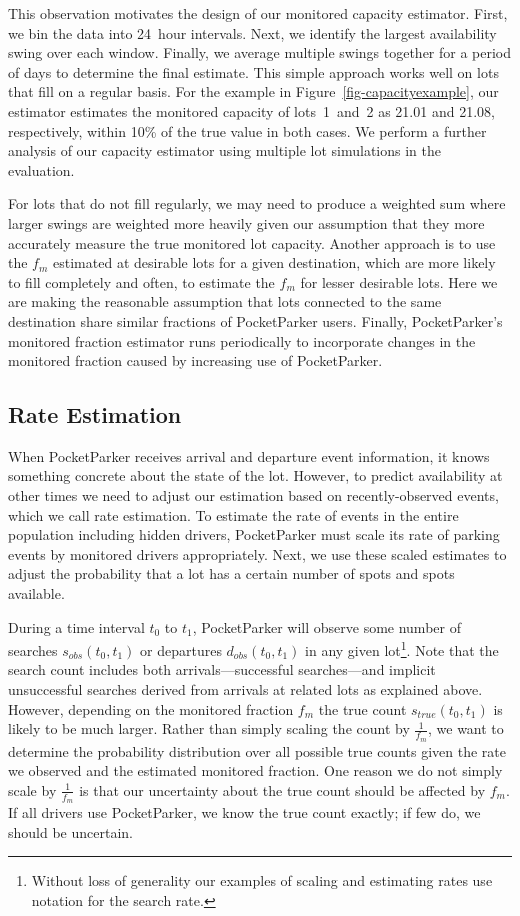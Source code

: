 This observation motivates the design of our monitored capacity estimator.
First, we bin the data into 24~hour intervals. Next, we identify the largest
availability swing over each window. Finally, we average multiple swings
together for a period of days to determine the final estimate. This simple
approach works well on lots that fill on a regular basis. For the example in
Figure~\ref{fig-capacityexample}, our estimator estimates the monitored
capacity of lots~1~and~2 as 21.01 and 21.08, respectively, within 10\% of the
true value in both cases. We perform a further analysis of our capacity
estimator using multiple lot simulations in the evaluation.

For lots that do not fill regularly, we may need to produce a
weighted sum where larger swings are weighted more heavily given our
assumption that they more accurately measure the true monitored lot capacity. 
Another approach is to use the $f_m$ estimated at
desirable lots for a given destination, which are more likely to fill
completely and often, to estimate the $f_m$ for
lesser desirable lots. Here we are making the reasonable assumption that lots
connected to the same destination share similar fractions of PocketParker
users. Finally, PocketParker's monitored fraction estimator runs periodically
to incorporate changes in the monitored fraction caused by increasing use of
PocketParker.

\subsection{Rate Estimation}

When PocketParker receives arrival and departure event information, it knows
something concrete about the state of the lot. However, to predict
availability at other times we need to adjust our estimation based on
recently-observed events, which we call rate estimation. To estimate the rate
of events in the entire population including hidden drivers, PocketParker
must scale its rate of parking events by monitored drivers appropriately.
Next, we use these scaled estimates to adjust the probability that a lot has
a certain number of spots and spots available.

During a time interval $t_0$ to $t_1$, PocketParker will observe some number
of searches $s_{obs}(t_0, t_1)$ or departures $d_{obs}(t_0, t_1)$ in any
given lot\footnote{Without loss of generality our examples of scaling and
estimating rates use notation for the search rate.}. Note that the search
count includes both arrivals---successful searches---and implicit
unsuccessful searches derived from arrivals at related lots as explained
above. However, depending on the monitored fraction $f_m$ the true count
$s_{true}(t_0, t_1)$ is likely to be much larger. Rather than simply scaling
the count by $\frac{1}{f_m}$, we want to determine the probability
distribution over all possible true counts given the rate we observed and the
estimated monitored fraction. One reason we do not simply scale by
$\frac{1}{f_m}$ is that our uncertainty about the true count should be
affected by $f_m$. If all drivers use PocketParker, we know the true count
exactly; if few do, we should be uncertain.

